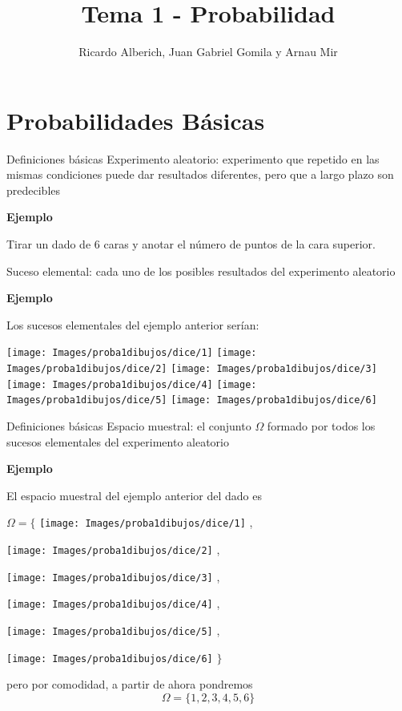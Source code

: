 \documentclass[
  ignorenonframetext,
]{beamer}
\title{Tema 1 - Probabilidad}
\author{Ricardo Alberich, Juan Gabriel Gomila y Arnau Mir}
\date{}
\begin{document}
\frame{\titlepage}

\hypertarget{probabilidades-buxe1sicas}{%
\section{Probabilidades Básicas}\label{probabilidades-buxe1sicas}}

\begin{frame}{Definiciones básicas}
\protect\hypertarget{definiciones-buxe1sicas}{}
Experimento aleatorio: experimento que repetido en las mismas
condiciones puede dar resultados diferentes, pero que a largo plazo son
predecibles

\textbf{Ejemplo}

Tirar un dado de 6 caras y anotar el número de puntos de la cara
superior.

Suceso elemental: cada uno de los posibles resultados del experimento
aleatorio

\textbf{Ejemplo}

Los sucesos elementales del ejemplo anterior serían:

\texttt{[image: Images/proba1dibujos/dice/1]}
\texttt{[image: Images/proba1dibujos/dice/2]}
\texttt{[image: Images/proba1dibujos/dice/3]}
\texttt{[image: Images/proba1dibujos/dice/4]}
\texttt{[image: Images/proba1dibujos/dice/5]}
\texttt{[image: Images/proba1dibujos/dice/6]}
\end{frame}

\begin{frame}{Definiciones básicas}
\protect\hypertarget{definiciones-buxe1sicas-1}{}
Espacio muestral: el conjunto \(\Omega\) formado por todos los sucesos
elementales del experimento aleatorio

\textbf{Ejemplo}

El espacio muestral del ejemplo anterior del dado es

\(\Omega=\Big\{\)
\texttt{[image: Images/proba1dibujos/dice/1]} ,

\texttt{[image: Images/proba1dibujos/dice/2]} ,

\texttt{[image: Images/proba1dibujos/dice/3]} ,

\texttt{[image: Images/proba1dibujos/dice/4]} ,

\texttt{[image: Images/proba1dibujos/dice/5]} ,

\texttt{[image: Images/proba1dibujos/dice/6]} \(\Big\}\)

pero por comodidad, a partir de ahora pondremos
\[\Omega = \{1,2,3,4,5,6\}\]
\end{frame}
\end{document}
